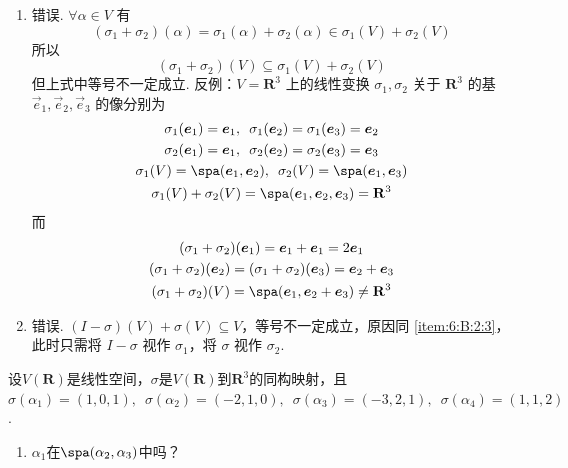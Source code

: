 \begin{exercise}
\begin{exgroup}
\begin{answer}
\begin{enumerate}
                \item \label{item:6:B:2:3}
                      错误. $ \forall \alpha \in V $ 有
                      \[ (\sigma_1 + \sigma_2)(\alpha) = \sigma_1(\alpha) + \sigma_2(\alpha) \in \sigma_1(V) + \sigma_2(V) \]
                      所以
                      \[ (\sigma_1 + \sigma_2)(V) \subseteq \sigma_1(V) + \sigma_2(V) \]
                      但上式中等号不一定成立. 反例：$ V = \mathbf{R}^3 $ 上的线性变换 $ \sigma_1, \sigma_2 $ 关于 $ \mathbf{R}^3 $ 的基 $ \vec{e}_1, \vec{e}_2, \vec{e}_3 $ 的像分别为
                      \begin{gather*}
                          \sigma_1(\vec{e}_1) = \vec{e}_1,\enspace \sigma_1(\vec{e}_2) = \sigma_1(\vec{e}_3) = \vec{e}_2 \\
                          \sigma_2(\vec{e}_1) = \vec{e}_1,\enspace \sigma_2(\vec{e}_2) = \sigma_2(\vec{e}_3) = \vec{e}_3 \\
                          \sigma_1(V) = \spa(\vec{e}_1, \vec{e}_2),\enspace \sigma_2(V) = \spa(\vec{e}_1, \vec{e}_3) \\
                          \sigma_1(V) + \sigma_2(V) = \spa(\vec{e}_1, \vec{e}_2, \vec{e}_3) = \mathbf{R}^3
                      \end{gather*}
                      而
                      \begin{gather*}
                          (\sigma_1 + \sigma_2)(\vec{e}_1) = \vec{e}_1 + \vec{e}_1 = 2 \vec{e}_1 \\
                          (\sigma_1 + \sigma_2)(\vec{e}_2) = (\sigma_1 + \sigma_2)(\vec{e}_3) = \vec{e}_2 + \vec{e}_3 \\
                          (\sigma_1 + \sigma_2)(V) = \spa(\vec{e}_1, \vec{e}_2 + \vec{e}_3) \neq \mathbf{R}^3
                      \end{gather*}

                \item 错误. $ (I - \sigma)(V) + \sigma(V) \subseteq V $，等号不一定成立，原因同 \ref*{item:6:B:2:3}，此时只需将 $ I - \sigma $ 视作 $ \sigma_1 $，将 $ \sigma $ 视作 $ \sigma_2 $.
            \end{enumerate}
        \end{answer}

        \item 设$V(\mathbf{R})$是线性空间，$\sigma$是$V(\mathbf{R})$到$\mathbf{R}^3$的同构映射，且$\sigma(\alpha_1)=(1,0,1),\enspace\allowbreak\sigma(\alpha_2)=(-2,1,0),\enspace\allowbreak\sigma(\alpha_3)=(-3,2,1),\enspace\allowbreak\sigma(\alpha_4)=(1,1,2)$.
        \begin{enumerate}
            \item $\alpha_1$在$\spa(\alpha_2,\alpha_3)$中吗？


\end{enumerate}
\end{exgroup}
\end{exercise}
